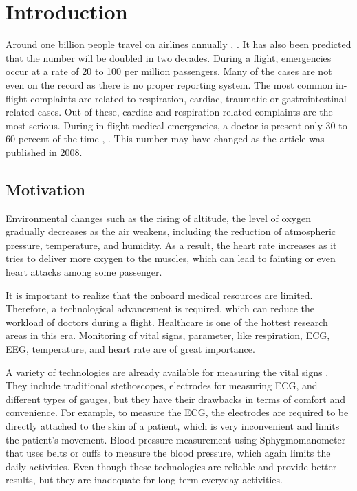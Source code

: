 \chapter{Introduction}

Around one billion people travel on airlines annually \cite{PMC2577402}, \cite{aerospace2003medical}. It has also been predicted that the number will be doubled in two decades. During a flight, emergencies occur at a rate of 20 to 100 per million passengers. Many of the cases are not even on the record as there is no proper reporting system. The most common in-flight complaints are related to respiration, cardiac, traumatic or gastrointestinal related cases. Out of these, cardiac and respiration related complaints are the most serious. During in-flight medical emergencies, a doctor is present only 30 to 60 percent of the time \cite{PMC2577402}, \cite{PMC1119071}. This number may have changed as the article was published in 2008.


\section{Motivation}

Environmental changes such as the rising of altitude, the level of oxygen gradually decreases as the air weakens, including the reduction of atmospheric pressure, temperature, and humidity. As a result, the heart rate increases as it tries to deliver more oxygen to the muscles, which can lead to fainting or even heart attacks among some passenger.

It is important to realize that the onboard medical resources are limited. Therefore, a technological advancement is required, which can reduce the workload of doctors during a flight. Healthcare is one of the hottest research areas in this era. Monitoring of vital signs, parameter, like respiration, ECG, EEG, temperature, and heart rate are of great importance.

A variety of technologies are already available for measuring the vital signs \cite{naturectlesshcs}. They include traditional stethoscopes, electrodes for measuring ECG, and different types of gauges, but they have their drawbacks in terms of comfort and convenience. For example, to measure the ECG, the electrodes are required to be directly attached to the skin of a patient, which is very inconvenient and limits the patient's movement. Blood pressure measurement using Sphygmomanometer that uses belts or cuffs to measure the blood pressure, which again limits the daily activities. Even though these technologies are reliable and provide better results, but they are inadequate for long-term everyday activities.

